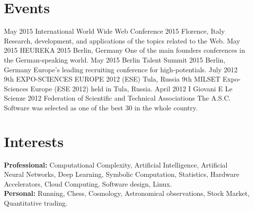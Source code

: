\documentclass[]{friggeri-cv}
\begin{document}
\section{Events}
\vspace{-3mm}
\begin{entrylist}
\entry
{May 2015}
{International World Wide Web Conference 2015}
{Florence, Italy}
{Research, development, and applications of the topics related to the Web.}
\entry
{May 2015}
{HEUREKA 2015}
{Berlin, Germany}
{One of the main founders conferences in the German­-speaking world.}
\entry
{May 2015}
{Berlin Talent Summit 2015}
{Berlin, Germany}
{Europe's leading recruiting conference for high-potentials.}
\entry
{July 2012}
{9th EXPO-SCIENCES EUROPE 2012 (ESE)}
{Tula, Russia}
{9th MILSET Expo-Sciences Europe (ESE 2012) held in Tula, Russia.}
\entry
{April 2012}
{I Giovani E Le Scienze 2012}
{Federation of Scientific and Technical Associations}
{The A.S.C. Software was selected as one of the best 30 in the whole country.}
\end{entrylist}


\section{Interests}
\vspace{-3mm}
\small \textbf{Professional:} Computational Complexity, Artificial Intelligence, Artificial Neural Networks, Deep Learning, Symbolic Computation, Statistics, Hardware Accelerators, Cloud Computing, Software design, Linux.\\
\small \textbf{Personal:} Running, Chess, Cosmology, Astronomical observations, Stock Market, Quantitative trading.
\clearpage
\end{document}
